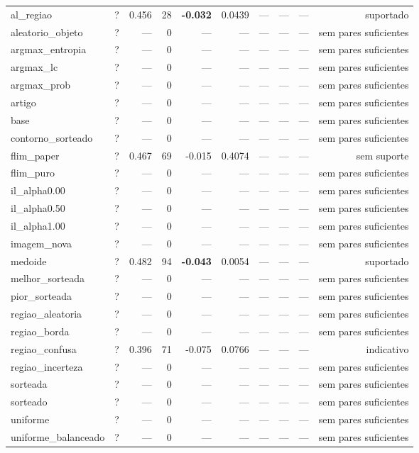 \begin{adjustbox}{max width=\linewidth}
\begin{tabular}{lrrrrrrrrr}
al\_regiao & ? & 0.456 & 28 & \textbf{-0.032} & 0.0439 & --- & --- & --- & suportado \\
aleatorio\_objeto & ? & --- & 0 & --- & --- & --- & --- & --- & sem pares suficientes \\
argmax\_entropia & ? & --- & 0 & --- & --- & --- & --- & --- & sem pares suficientes \\
argmax\_lc & ? & --- & 0 & --- & --- & --- & --- & --- & sem pares suficientes \\
argmax\_prob & ? & --- & 0 & --- & --- & --- & --- & --- & sem pares suficientes \\
artigo & ? & --- & 0 & --- & --- & --- & --- & --- & sem pares suficientes \\
base & ? & --- & 0 & --- & --- & --- & --- & --- & sem pares suficientes \\
contorno\_sorteado & ? & --- & 0 & --- & --- & --- & --- & --- & sem pares suficientes \\
flim\_paper & ? & 0.467 & 69 & -0.015 & 0.4074 & --- & --- & --- & sem suporte \\
flim\_puro & ? & --- & 0 & --- & --- & --- & --- & --- & sem pares suficientes \\
il\_alpha0.00 & ? & --- & 0 & --- & --- & --- & --- & --- & sem pares suficientes \\
il\_alpha0.50 & ? & --- & 0 & --- & --- & --- & --- & --- & sem pares suficientes \\
il\_alpha1.00 & ? & --- & 0 & --- & --- & --- & --- & --- & sem pares suficientes \\
imagem\_nova & ? & --- & 0 & --- & --- & --- & --- & --- & sem pares suficientes \\
medoide & ? & 0.482 & 94 & \textbf{-0.043} & 0.0054 & --- & --- & --- & suportado \\
melhor\_sorteada & ? & --- & 0 & --- & --- & --- & --- & --- & sem pares suficientes \\
pior\_sorteada & ? & --- & 0 & --- & --- & --- & --- & --- & sem pares suficientes \\
regiao\_aleatoria & ? & --- & 0 & --- & --- & --- & --- & --- & sem pares suficientes \\
regiao\_borda & ? & --- & 0 & --- & --- & --- & --- & --- & sem pares suficientes \\
regiao\_confusa & ? & 0.396 & 71 & -0.075 & 0.0766 & --- & --- & --- & indicativo \\
regiao\_incerteza & ? & --- & 0 & --- & --- & --- & --- & --- & sem pares suficientes \\
sorteada & ? & --- & 0 & --- & --- & --- & --- & --- & sem pares suficientes \\
sorteado & ? & --- & 0 & --- & --- & --- & --- & --- & sem pares suficientes \\
uniforme & ? & --- & 0 & --- & --- & --- & --- & --- & sem pares suficientes \\
uniforme\_balanceado & ? & --- & 0 & --- & --- & --- & --- & --- & sem pares suficientes \\
\bottomrule
\end{tabular}
\end{adjustbox}
